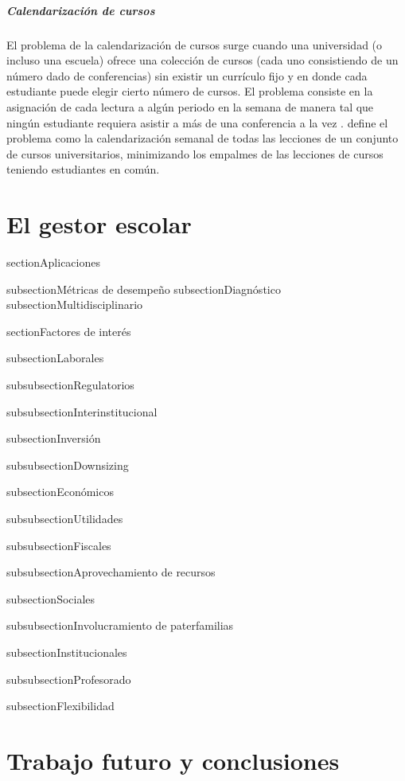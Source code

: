 \documentclass[spanish,draft,12pt,headsepline,footsepline,paper=letter]{scrreprt}
\begin{document}
\paragraph{Calendarización de cursos}

El problema de la calendarización de cursos surge cuando una universidad (o incluso una escuela) ofrece una colección de cursos (cada uno consistiendo de un número dado de conferencias) sin existir un currículo fijo y en donde cada estudiante puede elegir cierto número de cursos. El problema consiste en la asignación de cada lectura a algún periodo en la semana de manera tal que ningún estudiante requiera asistir a más de una conferencia a la vez \citep[p.~157]{werra85an-introduction-to-timetabling}.
\citet[p.~88]{schaerf99a-survey-of-automated} define el problema como la calendarización semanal de todas las lecciones de un conjunto de cursos universitarios, minimizando los empalmes de las lecciones de cursos teniendo estudiantes en común.

\chapter{El gestor escolar}

section{Aplicaciones}

subsection{Métricas de desempeño}
subsection{Diagnóstico}
subsection{Multidisciplinario}

section{Factores de interés}

subsection{Laborales}

subsubsection{Regulatorios}


subsubsection{Interinstitucional}

subsection{Inversión}

subsubsection{Downsizing}

subsection{Económicos}

subsubsection{Utilidades}

subsubsection{Fiscales}

subsubsection{Aprovechamiento de recursos}

subsection{Sociales}

subsubsection{Involucramiento de paterfamilias}

subsection{Institucionales}

subsubsection{Profesorado}

subsection{Flexibilidad}

\chapter{Trabajo futuro y conclusiones}
\end{document}
